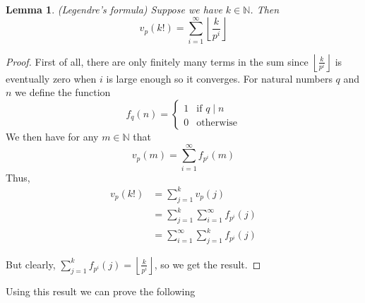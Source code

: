 \documentclass{article}
\newtheorem{lemma}{Lemma}[section]
\newcommand{\mbb}[1]{\mathbb{#1}}
\begin{document}
\begin{lemma}(Legendre's formula)
    Suppose we have $k \in \mbb N$. Then
    $$v_p(k!) = \sum_{i = 1}^{\infty} \left\lfloor \frac{k}{p^i} \right \rfloor$$
\end{lemma}

\begin{proof}
    First of all, there are only finitely many terms in the sum since $\left\lfloor \frac{k}{p^i} \right \rfloor$ is eventually zero when $i$ is large enough so it converges. For natural numbers $q$ and $n$ we define the function 
    $$f_q(n) = \begin{cases}
        1 & \text{if } q \mid n \\
        0 & \text{otherwise}
    \end{cases}$$
    We then have for any $m \in \mbb N$ that
    $$v_p(m) = \sum_{i = 1}^{\infty} f_{p^i}(m)$$
    Thus,
    \begin{align*}
        v_p(k!) &= \sum_{j = 1}^k v_p(j) \\
        &= \sum_{j = 1}^k \sum_{i = 1}^{\infty} f_{p^i}(j) \\
        &= \sum_{i = 1}^{\infty} \sum_{j = 1}^k f_{p^i}(j)
    \end{align*}


    But clearly, $\sum_{j = 1}^k f_{p^i}(j) = \left\lfloor \frac{k}{p^i} \right \rfloor$, so we get the result. 
\end{proof}

Using this result we can prove the following
\end{document}
